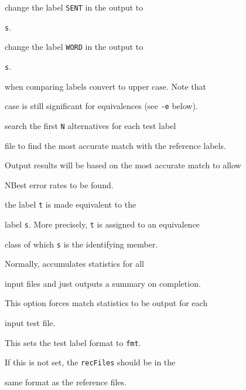 \begin{optlist}


   change the label \texttt{SENT} in the output to 


      \texttt{s}.





   change the label \texttt{WORD} in the output to 


      \texttt{s}.





   when comparing labels convert to upper case.  Note that


      case is still significant for equivalences (see \texttt{-e} below).





   search the first \texttt{N} alternatives for each test label


      file to find the most accurate match with the reference labels.


      Output results will be based on the most accurate match to allow 


      NBest error rates to be found.





    the label {\tt t} is made equivalent to the


      label {\tt s}.  More precisely, {\tt t} is assigned to an equivalence


      class of which {\tt s} is the identifying member.





   Normally,  accumulates statistics for all


      input files and just outputs a summary on completion.


      This option forces match statistics to be output for each


      input test file.


      


   This sets the test label format to {\tt fmt}. 


      If this is not set, the {\tt recFiles} should be in the


      same format as the reference files.






\end{optlist}
